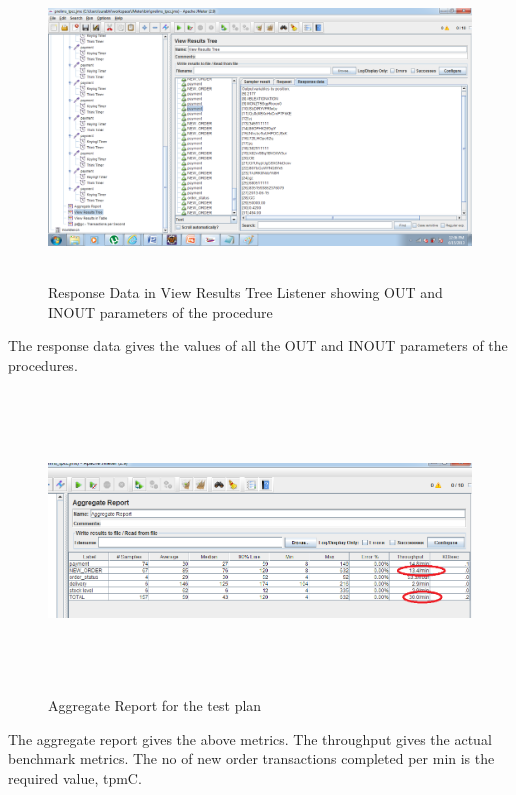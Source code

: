 \documentclass[12pt]{book}
\begin{document}
   \begin{figure}[H]
    \centering
    \includegraphics[width=15cm, height=8cm]{images/ntpcc_93}
    \caption{Response Data in View Results Tree Listener showing OUT and INOUT parameters of the procedure\label{fig:fig77_JMeter}}
   \end{figure}
   

   The response data gives the values of all the OUT and INOUT parameters of the procedures.\\
   
  \begin{figure}[H]
    \centering
    \includegraphics[width=15cm, height=8cm]{images/ntpcc_94}
    \caption{Aggregate Report for the test plan\label{fig:fig78_JMeter}}
   \end{figure}
   The aggregate report gives the above metrics. The throughput gives the actual benchmark
   metrics. The no of new order transactions completed per min is the required value, tpmC.
   
\end{document}
